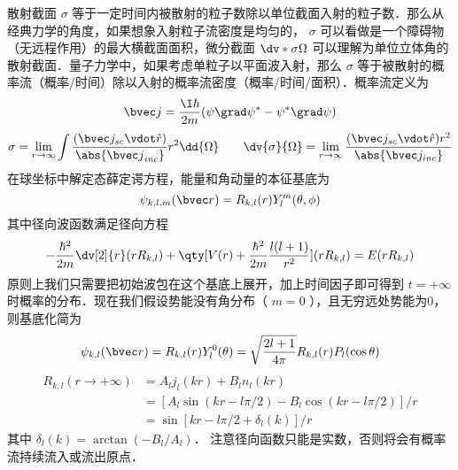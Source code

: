

散射截面 $\sigma$ 等于一定时间内被散射的粒子数除以单位截面入射的粒子数．那么从经典力学的角度，如果想象入射粒子流密度是均匀的， $\sigma$ 可以看做是一个障碍物（无远程作用）的最大横截面面积，微分截面 $\dv*{\sigma}{\Omega}$ 可以理解为单位立体角的散射截面．量子力学中，如果考虑单粒子以平面波入射，那么 $\sigma$ 等于被散射的概率流（概率/时间）除以入射的概率流密度（概率/时间/面积）．概率流定义为
\begin{equation}
\bvec j = \frac{\I\hbar }{2m}(\psi \grad \psi^* - \psi^* \grad \psi )
\end{equation}
\begin{equation}\label{ParWav_eq3}
\sigma  = \lim_{r \to \infty} \int \frac{(\bvec j_{sc} \vdot \hat r)}{\abs{{\bvec j}_{inc}}} r^2\dd{\Omega} 
\qquad
\dv{\sigma}{\Omega} = \lim_{r\to\infty} \frac{(\bvec j_{sc} \vdot \hat r) r^2}{\abs{\bvec j_{inc}}}
\end{equation}
在球坐标中解定态薛定谔方程，能量和角动量的本征基底为
\begin{equation}
\psi_{k,l,m}(\bvec r) = R_{k,l}(r) Y_l^m(\theta, \phi )
\end{equation}
其中径向波函数满足径向方程
\begin{equation}\label{ParWav_eq4}
-\frac{\hbar^2}{2m} \dv[2]{r} (rR_{k,l}) + \qty[V(r) + \frac{\hbar^2}{2m} \frac{l(l + 1)}{r^2}](r R_{k,l}) = E(rR_{k,l})
\end{equation}
原则上我们只需要把初始波包在这个基底上展开，加上时间因子即可得到 $t =  + \infty$ 时概率的分布．现在我们假设势能没有角分布（ $m = 0$ ），且无穷远处势能为0，则基底化简为
\begin{equation}
\psi_{k,l}(\bvec r) = R_{k,l}(r) Y_l^0(\theta ) = \sqrt{\frac{2l + 1}{4\pi }} R_{k,l}(r) P_l(\cos\theta)
\end{equation}
\begin{equation}\label{ParWav_eq6}
\begin{aligned}
R_{k,l}(r \to + \infty) &= A_l j_l(kr) + B_l n_l(kr) \\
&= [A_l\sin(kr - l\pi /2) - B_l\cos(kr - l\pi /2)]/r \\
&= \sin [kr - l\pi /2 + \delta_l(k)]/r
\end{aligned}
\end{equation}
其中 $\delta_l(k) = \arctan(- B_l/A_l)$． 注意径向函数只能是实数，否则将会有概率流持续流入或流出原点．

